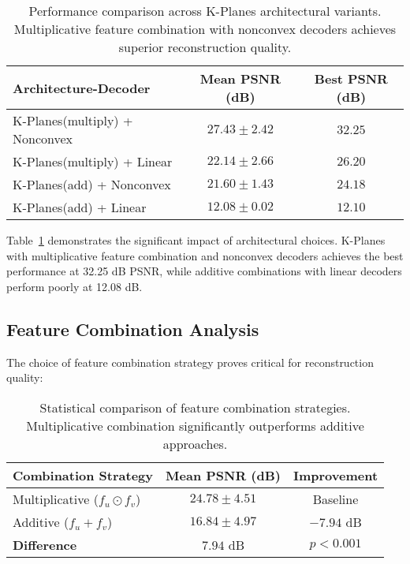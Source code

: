 \documentclass[10pt,twocolumn,letterpaper]{article}
\begin{document}
\begin{table}[t]
\centering
\small
\begin{tabular}{@{}lcc@{}}
\toprule
\textbf{Architecture-Decoder} & \textbf{Mean PSNR (dB)} & \textbf{Best PSNR (dB)} \\
\midrule
K-Planes(multiply) + Nonconvex & $27.43 \pm 2.42$ & $\mathbf{32.25}$ \\
K-Planes(multiply) + Linear & $22.14 \pm 2.66$ & $26.20$ \\
K-Planes(add) + Nonconvex & $21.60 \pm 1.43$ & $24.18$ \\
K-Planes(add) + Linear & $12.08 \pm 0.02$ & $12.10$ \\
\bottomrule
\end{tabular}
\caption{Performance comparison across K-Planes architectural variants. Multiplicative feature combination with nonconvex decoders achieves superior reconstruction quality.}
\label{tab:architecture_comparison}
\end{table}

Table~\ref{tab:architecture_comparison} demonstrates the significant impact of architectural choices. K-Planes with multiplicative feature combination and nonconvex decoders achieves the best performance at 32.25 dB PSNR, while additive combinations with linear decoders perform poorly at 12.08 dB.

\subsection{Feature Combination Analysis}

The choice of feature combination strategy proves critical for reconstruction quality:

\begin{table}[t]
\centering
\small
\begin{tabular}{@{}lcc@{}}
\toprule
\textbf{Combination Strategy} & \textbf{Mean PSNR (dB)} & \textbf{Improvement} \\
\midrule
Multiplicative ($f_u \odot f_v$) & $24.78 \pm 4.51$ & Baseline \\
Additive ($f_u + f_v$) & $16.84 \pm 4.97$ & $-7.94$ dB \\
\midrule
\textbf{Difference} & $\mathbf{7.94}$ dB & $p < 0.001$ \\
\bottomrule
\end{tabular}
\caption{Statistical comparison of feature combination strategies. Multiplicative combination significantly outperforms additive approaches.}
\label{tab:combination_analysis}
\end{table}
\end{document}
